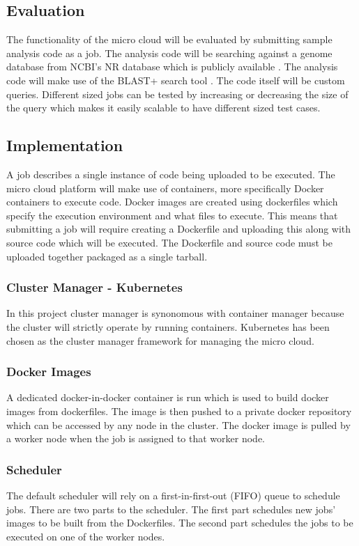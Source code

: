 \documentclass{sig-alternate-05-2015}
\begin{document}
\subsection{Evaluation}
The functionality of the micro cloud will be evaluated by submitting sample analysis code as a job. The analysis code will be searching against a genome database from NCBI's NR database which is publicly available \cite{pruitt2005ncbi}. The analysis code will make use of the BLAST+ search tool \cite{camacho2009blast}. The code itself will be custom queries. Different sized jobs can be tested by increasing or decreasing the size of the query which makes it easily scalable to have different sized test cases.



\subsection{Implementation}


A job describes a single instance of code being uploaded to be executed. 
The micro cloud platform will make use of containers, more specifically Docker containers to execute code. Docker images are created using dockerfiles which specify the execution environment and what files to execute. This means that submitting a job will require creating a Dockerfile and uploading this along with source code which will be executed. The Dockerfile and source code must be uploaded together packaged as a single tarball.  

\subsubsection{Cluster Manager - Kubernetes}
In this project cluster manager is synonomous with container manager because the cluster will strictly operate by running containers. Kubernetes has been chosen as the cluster manager framework for managing the micro cloud.

\subsubsection{Docker Images}
A dedicated docker-in-docker container is run which is used to build docker images from dockerfiles. The image is then pushed to a private docker repository which can be accessed by any node in the cluster. The docker image is pulled by a worker node when the job is assigned to that worker node.

\subsubsection{Scheduler}
The default scheduler will rely on a first-in-first-out (FIFO) queue to schedule jobs. There are two parts to the scheduler. The first part schedules new jobs' images to be built from the Dockerfiles. The second part schedules the jobs to be executed on one of the worker nodes.
\end{document}
